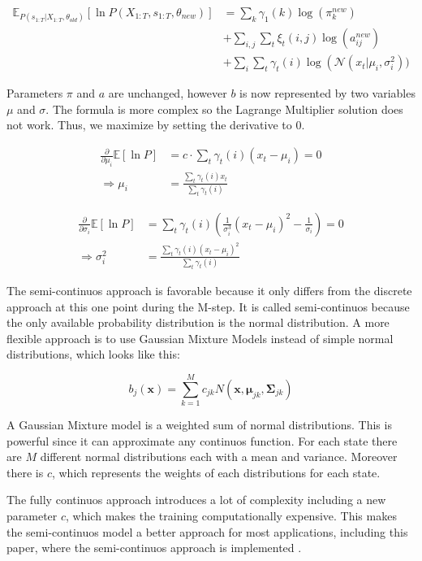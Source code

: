 \begin{equation}
\begin{aligned}
\mathbb{E}_{P\left(s_{1: T} | X_{1: T}, \theta_{o l d}\right)}\left[\ln P\left(X_{1: T}, s_{1: T}, \theta_{n e w}\right)\right] &=\sum_{k} \gamma_{1}(k) \log \left(\pi_{k}^{n e w}\right) \\
&+\sum_{i, j} \sum_{t} \xi_{t}(i, j) \log \left(a_{i j}^{n e w}\right) \\
&+\sum_{i} \sum_{t} \gamma_{t}(i)    \log \left(\mathcal{N}\left(x_{t} | \mu_{i}, \sigma_{i}^{2}\right)\right.  )
\end{aligned}
\end{equation}

Parameters $\pi$ and $a$ are unchanged, however $b$ is now represented by two variables $\mu$ and $\sigma$. The formula is more complex so the Lagrange Multiplier solution does not work. Thus, we maximize by setting the derivative to 0. 

\begin{equation}
\begin{aligned}
\frac{\partial}{\partial \mu_i} \mathbb{E}[\ln P] &= c \cdot \sum_t \gamma_t(i) (x_t - \mu_i) = 0 \\
\Rightarrow \mu_i &= \frac{\sum_t \gamma_t(i)x_t}{\sum_t \gamma_t(i)}
\end{aligned}
\label{eq:mu-def}
\end{equation}

\begin{equation}
\begin{aligned}
\frac{\partial}{\partial \sigma_i} \mathbb{E}[\ln P] &= \sum_t \gamma_t(i) (\frac{1}{\sigma_i^3}(x_t-\mu_i)^2 - \frac{1}{\sigma_i}) = 0 \\
\Rightarrow \sigma_i^2 &= \frac{\sum_t \gamma_t(i)(x_t - \mu_i)^2}{\sum_t \gamma_t(i)}
\end{aligned}
\label{eq:sigma-def}
\end{equation}

The semi-continuos approach is favorable because it only differs from the discrete approach at this one point during the M-step. It is called semi-continuos because the only available probability distribution is the normal distribution. A more flexible approach is to use Gaussian Mixture Models instead of simple normal distributions, which looks like this: 

\begin{equation}
  b_{j}(\mathbf{x})=\sum_{k=1}^{M} c_{j k} N\left(\mathbf{x}, \boldsymbol{\mu}_{j k}, \boldsymbol{\Sigma}_{j k}\right) 
\end{equation}

A Gaussian Mixture model is a weighted sum of normal distributions. This is powerful since it can approximate any continuos function. For each state there are $M$ different normal distributions each with a mean and variance. Moreover there is $c$, which represents the weights of each distributions for each state. 

The fully continuos approach introduces a lot of complexity including a new parameter $c$, which makes the training computationally expensive. This makes the semi-continuos model a better approach for most applications, including this paper, where the semi-continuos approach is implemented \parencite{huang2001spoken}.
